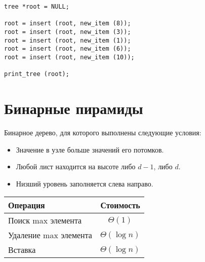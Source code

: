 \lstset{label=lst:bst-usage,caption=Пример использования}
\begin{lstlisting}
tree *root = NULL;

root = insert (root, new_item (8));
root = insert (root, new_item (3));
root = insert (root, new_item (1));
root = insert (root, new_item (6));
root = insert (root, new_item (10));

print_tree (root);
\end{lstlisting}

\section{Бинарные пирамиды}
\label{sec:bin-heaps}

Бинарное дерево, для которого выполнены следующие условия:
\begin{itemize}
  \item Значение в узле больше значений его потомков.
  \item Любой лист находится на высоте либо $d - 1$, либо $d$.
  \item Низший уровень заполняется слева направо.
\end{itemize}

\begin{center}
  \begin{tabular}{lc}
    \toprule
    Операция & Стоимость \\
    \midrule
    Поиск max элемента & $\Theta(1)$ \\
    Удаление max элемента & $\Theta(\log n)$ \\
    Вставка & $\Theta(\log n)$ \\
    \bottomrule
  \end{tabular}
\end{center}

